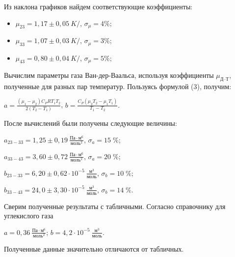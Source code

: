 \documentclass[a4paper, 12pt]{article}
\begin{document}
Из наклона графиков найдем соответствующие коэффициенты:

\bigskip

\begin{itemize}
	\item $\displaystyle \mu_{23} = 1,17 \pm 0,05\  K/$, $\displaystyle \sigma_{\mu} = 4\%$;\break
	\item $\displaystyle \mu_{33} = 1,07 \pm 0,03\  K/$, $\displaystyle \sigma_{\mu} = 3\%$;\break
	\item $\displaystyle \mu_{43} = 0,80 \pm 0,04\  K/$, $\displaystyle \sigma_{\mu} = 5\%$;\break
\end{itemize}

Вычислим параметры газа Ван-дер-Ваальса, используя коэффициенты $ \mu_\text{Д--Т} $, полученные для разных пар температур.
Пользуясь формулой (3), получим:

\begin{center}
	$\displaystyle a = \frac{\left(\mu_1 - \mu_2\right)C_PRT_1T_2}{2\left(T_2-T_1\right)}$,\break\break
	$\displaystyle b = \frac{C_P(\mu_2T_2-\mu_1T_1)}{T_1-T_2}. $
\end{center}

После вычислений были получены следующие величины:

\begin{center}
	$\displaystyle a_{23-33}= 1,25 \pm 0,19 \  \frac{\text{Па}\cdot \text{м}^6}{\text{моль}^2}$, $\displaystyle \sigma_{a} = 15 \; \%$; \break

	$\displaystyle a_{33-43}= 3,60 \pm 0,72 \  \frac{\text{Па}\cdot \text{м}^6}{\text{моль}^2}$, $\displaystyle \sigma_{a} = 20 \; \%$; \break

	$\displaystyle b_{23-33}= 6,20 \pm 0,62 \cdot 10^{-5} \ \frac{\text{м}^3}{\text{моль}}$, $\displaystyle \sigma_{b} = 10 \; \%$; \break
	
	$\displaystyle b_{33-43}= 24,0 \pm 3,30 \cdot 10^{-5} \ \frac{\text{м}^3}{\text{моль}}$, $\displaystyle \sigma_{b} = 14 \; \%$. \break
\end{center}
	
Сверим полученные результаты с табличными. Согласно справочнику для углекислого газа

\begin{center}    
	$\displaystyle a = 0,36 \  \frac{\text{Па}\cdot\text{м}^6}{\text{моль}^2}$; \break$\displaystyle b = 4,2\cdot 10^{-5} \ \frac{\text{м}^3}{\text{моль}}.$ 
\end{center}

Полученные данные значительно отличаются от табличных.
\end{document}
